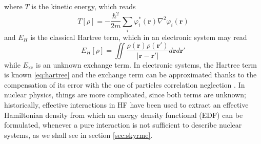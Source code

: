 where $T$ is the kinetic energy, which reads
\begin{equation}
    \label{eq:kin_functional}
    T[\rho] = -\frac{\hbar^2}{2m}\sum_i \varphi_i ^*(\bm r)\nabla^2 \varphi_i(\bm r)
\end{equation}
and $E_H$ is the classical Hartree term, which in an electronic system may read
\begin{equation}
    \label{eq:elec}
    E_H[\rho] = \iint \frac{\rho(\bm r)\rho(\bm r')}{|\bm r-\bm r'|} d\bm r d\bm r'
\end{equation}
while $E_\text{xc}$ is an unknown exchange term. In electronic systems, the Hartree term is known \eqref{eq:hartree} and the exchange term can be approximated thanks to the compensation of its error with the one of particles correlation neglection \cite{Martin2004}. In nuclear physics, things are more complicated, since both terms are unknown; historically, effective interactions in HF have been used to extract an effective Hamiltonian density from which an energy density functional (EDF) can be formulated, whenever a pure interaction is not sufficient to describe nuclear systems, as we shall see in section \ref{sec:skyrme}.
